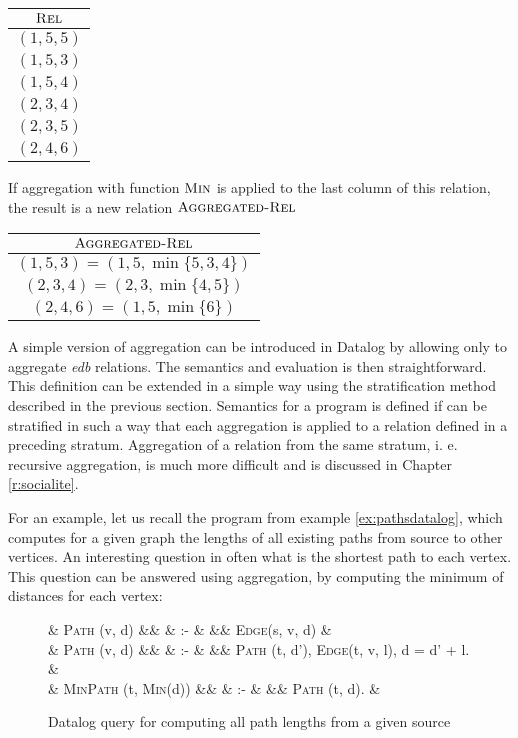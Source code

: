 \documentclass{pracamgr}
\theoremstyle{plain}
\theoremstyle{definition}
\theoremstyle{remark}
\newenvironment{centab}[1]{\begin{center}\begin{tabular}{#1}}{\end{tabular}\end{center}}
\newcommand{\narrow}[1]{\begin{changemargin}{2cm}{2cm} #1 \end{changemargin}}
\newcommand{\dprog}[4]{
  \begin{figure}[h!]
    \narrow{
      #1
      \begin{flalign*}
      #2
      \end{flalign*}
      \caption{#3}
      \label{#4}
    }
\end{figure}

}
\begin{document}
\begin{centab}{ | c | }
  \hline
  $\textsc{Rel}$ \\
  \hline
  $(1, 5, 5)$ \\
  $(1, 5, 3)$ \\
  $(1, 5, 4)$ \\
  $(2, 3, 4)$ \\
  $(2, 3, 5)$ \\
  $(2, 4, 6)$ \\
  \hline
\end{centab}

If aggregation with function $\textsc{Min}$ is applied to the last column of this relation, the result is a new relation $\textsc{Aggregated-Rel}$

\begin{centab}{ | c | }
  \hline
  $\textsc{Aggregated-Rel}$ \\
  \hline
  $(1, 5, 3) = (1, 5, \min{\{5, 3, 4\}})$ \\
  $(2, 3, 4) = (2, 3, \min{\{4, 5\}})$ \\
  $(2, 4, 6) = (1, 5, \min{\{6\}})$ \\
  \hline
\end{centab}

A simple version of aggregation can be introduced in Datalog by allowing only to aggregate \emph{edb} relations. The semantics and evaluation is then straightforward. This definition can be extended in a simple way using the stratification method described in the previous section. Semantics for a program is defined if can be stratified in such a way that each aggregation is applied to a relation defined in a preceding stratum. Aggregation of a relation from the same stratum, i. e. recursive aggregation, is much more difficult and is discussed in Chapter \ref{r:socialite}.

For an example, let us recall the program from example \ref{ex:pathsdatalog}, which computes for a given graph the lengths of all existing paths from source to other vertices. An interesting question in often what is the shortest path to each vertex. This question can be answered using aggregation, by computing the minimum of distances for each vertex: 

\dprog{}{
  & \textsc{Path} (v, d) &&  & :- & && \textsc{Edge}(s, v, d) & \\
  & \textsc{Path} (v, d) &&  & :- & && \textsc{Path} (t, d'), \textsc{Edge}(t, v, l), d = d' + l. &\\
  & \textsc{MinPath} (t, \textsc{Min}(d)) &&  & :- & && \textsc{Path} (t, d). &
}{Datalog query for computing all path lengths from a given source}{ex:pathsdatalogaggregate}
\end{document}
